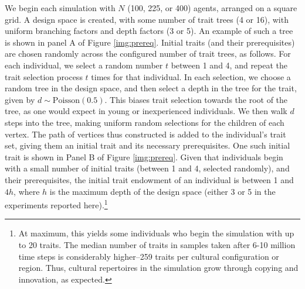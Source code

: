 We begin each simulation with $N$ (100, 225, or 400) agents, arranged on
a square grid. A design space is created, with some number of trait
trees (4 or 16), with uniform branching factors and depth factors (3 or
5). An example of such a tree is shown in panel A of Figure
\ref{img:prereq}. Initial traits (and their prerequisites) are chosen
randomly across the configured number of trait trees, as follows. For
each individual, we select a random number $t$ between 1 and 4, and
repeat the trait selection process $t$ times for that individual. In
each selection, we choose a random tree in the design space, and then
select a depth in the tree for the trait, given by
$d  \sim \textrm{Poisson}(0.5)$. This biases trait selection towards the
root of the tree, as one would expect in young or inexperienced
individuals. We then walk $d$ steps into the tree, making uniform random
selections for the children of each vertex. The path of vertices thus
constructed is added to the individual's trait set, giving them an
initial trait and its necessary prerequisites. One such initial trait is
shown in Panel B of Figure \ref{img:prereq}. Given that individuals
begin with a small number of initial traits (between 1 and 4, selected
randomly), and their prerequisites, the initial trait endowment of an
individual is between 1 and $4h$, where $h$ is the maximum depth of the
design space (either 3 or 5 in the experiments reported here).\footnote{At
  maximum, this yields some individuals who begin the simulation with up
  to 20 traits. The median number of traits in samples taken after 6-10
  million time steps is considerably higher--259 traits per cultural
  configuration or region. Thus, cultural repertoires in the simulation
  grow through copying and innovation, as expected.}

